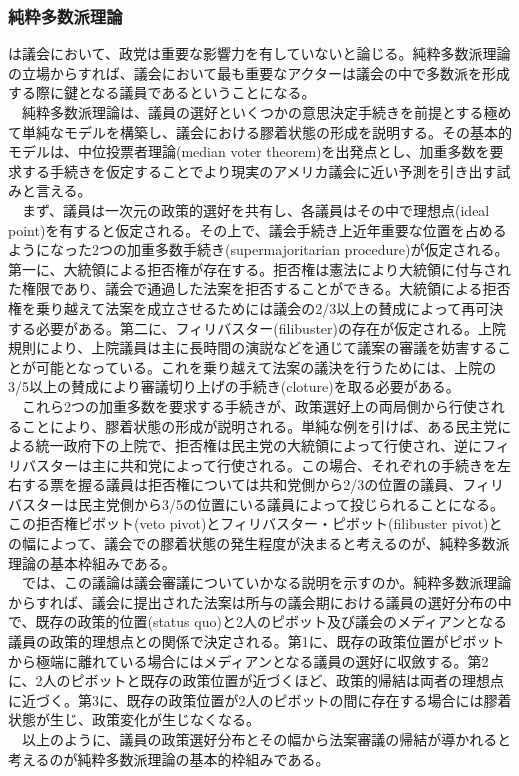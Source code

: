 \documentclass{article}
\begin{document}
\subsubsection{純粋多数派理論}
\citet*{Krehbiel1998-ob,Krehbiel2010-ob}は議会において、政党は重要な影響力を有していないと論じる。純粋多数派理論の立場からすれば、議会において最も重要なアクターは議会の中で多数派を形成する際に鍵となる議員であるということになる。\\
　純粋多数派理論は、議員の選好といくつかの意思決定手続きを前提とする極めて単純なモデルを構築し、議会における膠着状態の形成を説明する。その基本的モデルは、中位投票者理論(median voter theorem)を出発点とし、加重多数を要求する手続きを仮定することでより現実のアメリカ議会に近い予測を引き出す試みと言える。\\
　まず、議員は一次元の政策的選好を共有し、各議員はその中で理想点(ideal point)を有すると仮定される。その上で、議会手続き上近年重要な位置を占めるようになった2つの加重多数手続き(supermajoritarian procedure)が仮定される。第一に、大統領による拒否権が存在する。拒否権は憲法により大統領に付与された権限であり、議会で通過した法案を拒否することができる。大統領による拒否権を乗り越えて法案を成立させるためには議会の2/3以上の賛成によって再可決する必要がある。第二に、フィリバスター(filibuster)の存在が仮定される。上院規則により、上院議員は主に長時間の演説などを通じて議案の審議を妨害することが可能となっている。これを乗り越えて法案の議決を行うためには、上院の3/5以上の賛成により審議切り上げの手続き(cloture)を取る必要がある。\\
　これら2つの加重多数を要求する手続きが、政策選好上の両局側から行使されることにより、膠着状態の形成が説明される。単純な例を引けば、ある民主党による統一政府下の上院で、拒否権は民主党の大統領によって行使され、逆にフィリバスターは主に共和党によって行使される。この場合、それぞれの手続きを左右する票を握る議員は拒否権については共和党側から2/3の位置の議員、フィリバスターは民主党側から3/5の位置にいる議員によって投じられることになる。この拒否権ピボット(veto pivot)とフィリバスター・ピボット(filibuster pivot)との幅によって、議会での膠着状態の発生程度が決まると考えるのが、純粋多数派理論の基本枠組みである。\\
　では、この議論は議会審議についていかなる説明を示すのか。純粋多数派理論からすれば、議会に提出された法案は所与の議会期における議員の選好分布の中で、既存の政策的位置(status quo)と2人のピボット及び議会のメディアンとなる議員の政策的理想点との関係で決定される。第1に、既存の政策位置がピボットから極端に離れている場合にはメディアンとなる議員の選好に収斂する。第2に、2人のピボットと既存の政策位置が近づくほど、政策的帰結は両者の理想点に近づく。第3に、既存の政策位置が2人のピボットの間に存在する場合には膠着状態が生じ、政策変化が生じなくなる。\\
　以上のように、議員の政策選好分布とその幅から法案審議の帰結が導かれると考えるのが純粋多数派理論の基本的枠組みである。\\
\end{document}
